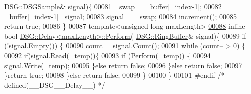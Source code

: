 \begin{DoxyCode}
      \hyperlink{namespace_d_s_g_ac39a94cd27ebcd9c1e7502d0c624894a}{DSG::DSGSample}& signal)\{
00081         \_swap = \hyperlink{_driver_8cpp_acce4d24812914a6b276156d1a3d3e851}{\_buffer}[\_index-1];
00082         \hyperlink{_driver_8cpp_acce4d24812914a6b276156d1a3d3e851}{\_buffer}[\_index-1]=signal;
00083         signal = \_swap;
00084         increment();
00085         \textcolor{keywordflow}{return} \textcolor{keyword}{true};
00086     \}
00087     \textcolor{keyword}{template}<\textcolor{keywordtype}{unsigned} \textcolor{keywordtype}{long} maxLength>
\hypertarget{_delay_8h_source_l00088}{}\hyperlink{class_d_s_g_1_1_delay_a205bd6fc25ea951395943eae51128e66}{00088}     \textcolor{keyword}{inline} \textcolor{keywordtype}{bool} \hyperlink{class_d_s_g_1_1_delay_afe853b73a1d7d1e5720277e5d956b209}{DSG::Delay<maxLength>::Perform}(
      \hyperlink{class_d_s_g_1_1_ring_buffer}{DSG::RingBuffer}& signal)\{
00089         \textcolor{keywordflow}{if} (!signal.\hyperlink{class_d_s_g_1_1_ring_buffer_ac1346f5842d08b988a5297abe4089b96}{Empty}()) \{
00090             count = signal.\hyperlink{class_d_s_g_1_1_ring_buffer_a9bd79b0a6dff618b205e396c101ee070}{Count}();
00091             \textcolor{keywordflow}{while} (count-- > 0) \{
00092                 \textcolor{keywordflow}{if}(signal.\hyperlink{class_d_s_g_1_1_ring_buffer_a6b2848a64f15c7b0c320779582fa0fbe}{Read}(\_temp))\{
00093                     \textcolor{keywordflow}{if} (Perform(\_temp)) \{
00094                         signal.\hyperlink{class_d_s_g_1_1_ring_buffer_aa5dd2caa0a270173251faee40a43d692}{Write}(\_temp);
00095                     \}\textcolor{keywordflow}{else} \textcolor{keywordflow}{return} \textcolor{keyword}{false};
00096                 \}\textcolor{keywordflow}{else} \textcolor{keywordflow}{return} \textcolor{keyword}{false};
00097             \}\textcolor{keywordflow}{return} \textcolor{keyword}{true};
00098         \}\textcolor{keywordflow}{else} \textcolor{keywordflow}{return} \textcolor{keyword}{false};
00099     \}
00100 \}
00101 \textcolor{preprocessor}{#endif }\textcolor{comment}{/* defined(\_\_DSG\_\_Delay\_\_) */}\textcolor{preprocessor}{}
\end{DoxyCode}
